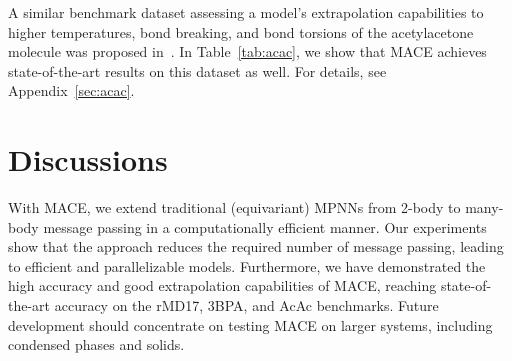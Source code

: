 \documentclass{article}
\begin{document}
A similar benchmark dataset assessing a model's extrapolation capabilities to higher temperatures, bond breaking,
and bond torsions of the acetylacetone molecule was proposed in~\cite{botnet}.
In Table~\ref{tab:acac}, we show that MACE achieves state-of-the-art results on this dataset as well.
For details, see Appendix~\ref{sec:acac}.
%
\begin{table}[h!]
  \caption{
    \textbf{Root-mean-square errors on the acetylacetone dataset.}
    Energy (E, meV) and force (F, meV/\AA) errors of models trained on configurations
    of the acetylacetone molecule sampled at 300~K and tested on configurations sampled at 300~K and 600~K.
    Standard deviations are computed over three runs.
  }
  \label{tab:acac}
  \centering
\end{table}

\section{Discussions}
\label{sec:Discussions}

With MACE, we extend traditional (equivariant) MPNNs from 2-body to many-body message passing in a computationally efficient manner.
Our experiments show that the approach reduces the required number of message passing, leading to efficient and parallelizable models.
Furthermore, we have demonstrated the high accuracy and good extrapolation capabilities of MACE, reaching state-of-the-art accuracy on the rMD17, 3BPA, and AcAc benchmarks.
Future development should concentrate on testing MACE on larger systems, including condensed phases and solids.
\end{document}
